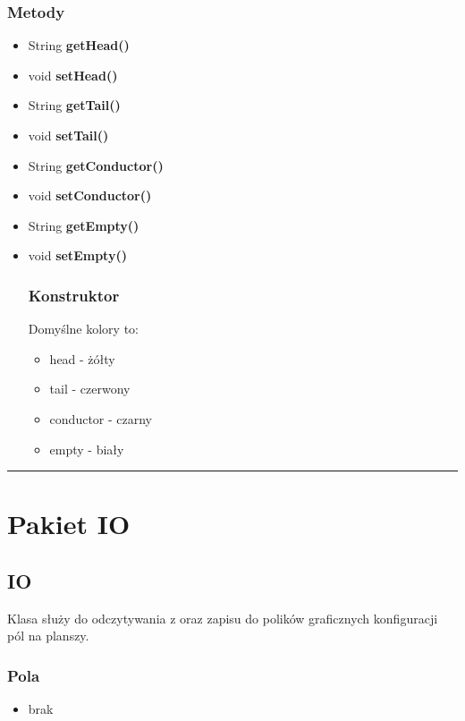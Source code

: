 \documentclass[a4paper,11pt]{article}
\newcommand{\linia}{\rule{\linewidth}{0.4mm}}
\begin{document}
\subsubsection{Metody}
\begin{itemize}
\item String \textbf{getHead()}
\item void \textbf{setHead()}
\item String \textbf{getTail()}
\item void \textbf{setTail()}
\item String \textbf{getConductor()}
\item void \textbf{setConductor()}
\item String \textbf{getEmpty()}
\item void \textbf{setEmpty()}
\subsubsection{Konstruktor}
Domyślne kolory to:
\begin{itemize}
\item head - żółty
\item tail - czerwony
\item conductor - czarny
\item empty - biały
\end{itemize}
\end{itemize}
\noindent\linia







\section{Pakiet IO}

\subsection{IO}

Klasa służy do odczytywania z oraz zapisu do polików graficznych konfiguracji pól na planszy.
\subsubsection{Pola}
\begin{itemize}
\item brak
\end{itemize}
\end{document}
